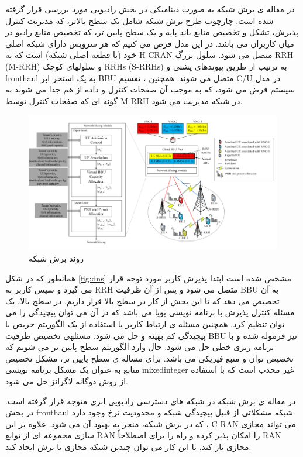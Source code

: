 در مقاله ی \cite{lee2018dynamic}
برش شبکه به صورت دینامیکی در بخش رادیویی مورد بررسی قرار گرفته شده است.
چارچوب طرح برش شبکه شامل یک سطح بالاتر، که مدیریت کنترل پذیرش، تشکل و تخصیص منابع باند پایه و یک سطح پایین تر، که تخصیص منابع رادیو در میان کاربران می باشد.
در این مدل فرض می کنیم که هر سرویس دارای شبکه اصلی خود (یا قطعه اصلی شبکه) است که به H-CRAN متصل می شود.
سلول بزرگ RRH (M-RRH) و سلولهای کوچک RRHs (S-RRHs) به ترتیب از طریق پیوندهای پشتی و fronthaul به یک استخر ابر
BBU  متصل می شوند.
همچنین ، تقسیم C/U در مدل سیستم فرض می شود، که به موجب آن صفحات کنترل و داده از هم جدا می شوند به گونه ای که صفحات کنترل توسط M-RRH در شبکه مدیریت می شود.
\begin{figure}[H]
  \centering
    \includegraphics[scale = 0.7]{./fig/dynamicNS}
  \caption{روند برش شبکه\ \cite{lee2018dynamic}}
  \label{fig:dns}
\end{figure}
همانطور که در شکل \eqref{fig:dns} 
مشخص شده است ابتدا پذیرش کاربر مورد توجه قرار می گیرد و سپس کاربر به RRH متصل می شود و پس از آن ظرفیت BBU به آن تخصیص می دهد که تا این بخش از کار در سطح بالا قرار داریم.
در سطح بالا، یک مسئله کنترل پذیرش با برنامه نویسی پویا می باشد که در آن می توان پیچیدگی را می توان تنظیم کرد.
همچنین مسئله ی ارتباط کاربر با استفاده از یک الگوریتم حریص با پیچیدگی کم بهینه و حل می شود.
 مسئلهی تخصیص ظرفیت BBU نیز فرموله شده و با برنامه ریزی خطی حل می شود.
 حال وارد الگوریتم سطح پایین تر می شویم که تخصیص توان و منبع فیزیکی می باشد.
برای مساله ی سطح پایین تر، مشکل تخصیص منابع به عنوان یک مشکل برنامه نویسی mixedinteger غیر محدب است که با استفاده از روش دوگانه لاگرانژ حل می شود.


در مقاله ی 
\cite{larsen2018fronthaul,costanzo2018network}
برش شبکه در شبکه های دسترسی رادیویی ابری متوجه قرار گرفته است. 
در بخش fronthaul شبکه مشکلاتی از قبیل پیچیدگی شبکه و محدودیت نرخ وجود دارد که در برش شبکه، منجر به بهبود آن می شود.
علاوه بر این ، C-RAN می تواند مجازی سازی مجموعه ای از توابع RAN را امکان پذیر کرده و راه را برای اصطلاحاً RAN مجازی باز کند. با این کار می توان چندین شبکه مجازی یا برش ایجاد کند.


